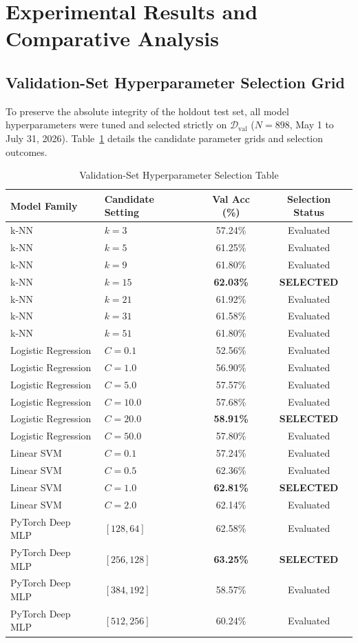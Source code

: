\documentclass[journal]{IEEEtran}
\begin{document}
\section{Experimental Results and Comparative Analysis}
\subsection{Validation-Set Hyperparameter Selection Grid}
To preserve the absolute integrity of the holdout test set, all model hyperparameters were tuned and selected strictly on $\mathcal{D}_{\text{val}}$ ($N = 898$, May 1 to July 31, 2026). Table~\ref{tab:tuning} details the candidate parameter grids and selection outcomes.

\begin{table}[t]
\caption{Validation-Set Hyperparameter Selection Table}
\label{tab:tuning}
\centering
\small
\begin{tabular}{llcc}
\toprule
\textbf{Model Family} & \textbf{Candidate Setting} & \textbf{Val Acc (\%)} & \textbf{Selection Status} \\
\midrule
k-NN & $k=3$ & 57.24\% & Evaluated \\
k-NN & $k=5$ & 61.25\% & Evaluated \\
k-NN & $k=9$ & 61.80\% & Evaluated \\
k-NN & $k=15$ & \textbf{62.03\%} & \textbf{SELECTED} \\
k-NN & $k=21$ & 61.92\% & Evaluated \\
k-NN & $k=31$ & 61.58\% & Evaluated \\
k-NN & $k=51$ & 61.80\% & Evaluated \\
\midrule
Logistic Regression & $C=0.1$ & 52.56\% & Evaluated \\
Logistic Regression & $C=1.0$ & 56.90\% & Evaluated \\
Logistic Regression & $C=5.0$ & 57.57\% & Evaluated \\
Logistic Regression & $C=10.0$ & 57.68\% & Evaluated \\
Logistic Regression & $C=20.0$ & \textbf{58.91\%} & \textbf{SELECTED} \\
Logistic Regression & $C=50.0$ & 57.80\% & Evaluated \\
\midrule
Linear SVM & $C=0.1$ & 57.24\% & Evaluated \\
Linear SVM & $C=0.5$ & 62.36\% & Evaluated \\
Linear SVM & $C=1.0$ & \textbf{62.81\%} & \textbf{SELECTED} \\
Linear SVM & $C=2.0$ & 62.14\% & Evaluated \\
\midrule
PyTorch Deep MLP & $[128, 64]$ & 62.58\% & Evaluated \\
PyTorch Deep MLP & $[256, 128]$ & \textbf{63.25\%} & \textbf{SELECTED} \\
PyTorch Deep MLP & $[384, 192]$ & 58.57\% & Evaluated \\
PyTorch Deep MLP & $[512, 256]$ & 60.24\% & Evaluated \\
\bottomrule
\end{tabular}
\end{table}
\end{document}
